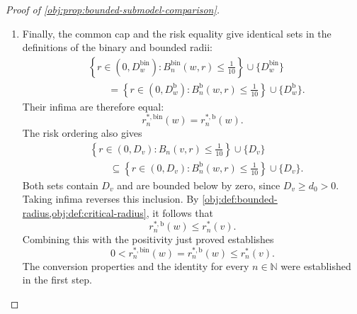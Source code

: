 \documentclass[11pt]{article}
\begin{document}
\begin{proof}[Proof of \cref{obj:prop:bounded-submodel-comparison}]
\begin{enumerate}
\item Finally, the common cap and the risk equality give identical sets in the definitions of the binary and bounded radii:
\[
\begin{split}
&\left\{r\in(0,D_w^{\mathrm{bin}}):
 B_n^{\mathrm{bin}}(w,r)\le\frac1{10}\right\}
 \cup\{D_w^{\mathrm{bin}}\}\\
&\qquad=
\left\{r\in(0,D_w^{\mathrm b}):
 B_n^{\mathrm b}(w,r)\le\frac1{10}\right\}
 \cup\{D_w^{\mathrm b}\}.
\end{split}
\]
Their infima are therefore equal:
\[
r_n^{*,\mathrm{bin}}(w)=r_n^{*,\mathrm b}(w).
\]
The risk ordering also gives
\[
\begin{split}
&\left\{r\in(0,D_v):B_n(v,r)\le\frac1{10}\right\}\cup\{D_v\}\\
&\qquad\subseteq
\left\{r\in(0,D_v):B_n^{\mathrm b}(w,r)\le\frac1{10}\right\}
\cup\{D_v\}.
\end{split}
\]
Both sets contain \(D_v\) and are bounded below by zero, since \(D_v\ge d_0>0\). Taking infima reverses this inclusion. By
\cref{obj:def:bounded-radius,obj:def:critical-radius}, it follows that
\[
r_n^{*,\mathrm b}(w)\le r_n^*(v).
\]
Combining this with the positivity just proved establishes
\[
0<r_n^{*,\mathrm{bin}}(w)
=r_n^{*,\mathrm b}(w)\le r_n^*(v).
\]
The conversion properties and the identity for every \(n\in\mathbb N\) were established in the first step.
\end{enumerate}
\end{proof}
\end{document}

